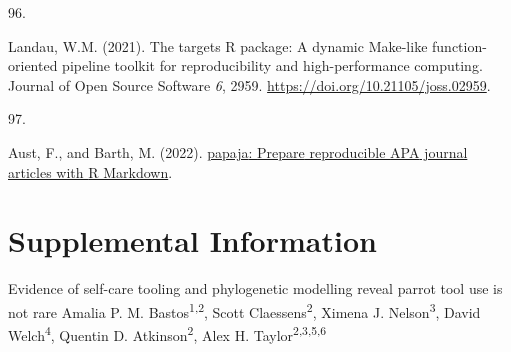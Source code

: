 \documentclass[
  man, donotrepeattitle,floatsintext]{apa6}
\newlength{\cslhangindent}
\newlength{\csllabelwidth}
\newlength{\cslentryspacingunit} %
\newenvironment{CSLReferences}[2] %
 {%
  \setlength{\parindent}{0pt}
  \ifodd #1
  \let\oldpar\par
  \def\par{\hangindent=\cslhangindent\oldpar}
  \fi
  \setlength{\parskip}{#2\cslentryspacingunit}
 }%
 {}
\newcommand{\CSLLeftMargin}[1]{\parbox[t]{\csllabelwidth}{#1}}
\newcommand{\CSLRightInline}[1]{\parbox[t]{\linewidth - \csllabelwidth}{#1}\break}
\begin{document}
\begin{CSLReferences}{0}{0}
\leavevmode{}%
\CSLLeftMargin{96. }%
\CSLRightInline{Landau, W.M. (2021). The targets {R} package: A dynamic {M}ake-like function-oriented pipeline toolkit for reproducibility and high-performance computing. Journal of Open Source Software \emph{6}, 2959. \url{https://doi.org/10.21105/joss.02959}.}

\leavevmode{}%
\CSLLeftMargin{97. }%
\CSLRightInline{Aust, F., and Barth, M. (2022). \href{https://github.com/crsh/papaja}{{papaja}: {Prepare} reproducible {APA} journal articles with {R Markdown}}.}

\end{CSLReferences}

\endgroup

\newpage
\vspace*{60mm}

\renewcommand{\figurename}{Figure}
\renewcommand{\tablename}{Table}
\renewcommand{\thefigure}{S\arabic{figure}} \setcounter{figure}{0}
\renewcommand{\thetable}{S\arabic{table}} \setcounter{table}{0}
\renewcommand{\theequation}{S\arabic{equation}} \setcounter{equation}{0}

\hypertarget{supplemental-information}{%
\section{\texorpdfstring{\textbf{Supplemental Information}}{Supplemental Information}}\label{supplemental-information}}

\setcounter{page}{1}
\centering

\noindent \hspace*{5mm} \small Evidence of self-care tooling and phylogenetic modelling reveal parrot tool use is not rare \newline
\hspace*{1cm} \small Amalia P. M. Bastos\textsuperscript{1,2}, Scott Claessens\textsuperscript{2}, Ximena J. Nelson\textsuperscript{3}, David Welch\textsuperscript{4}, \newline
\hspace*{25mm} Quentin D. Atkinson\textsuperscript{2}, Alex H. Taylor\textsuperscript{2,3,5,6} \newline

\raggedright
\end{document}
